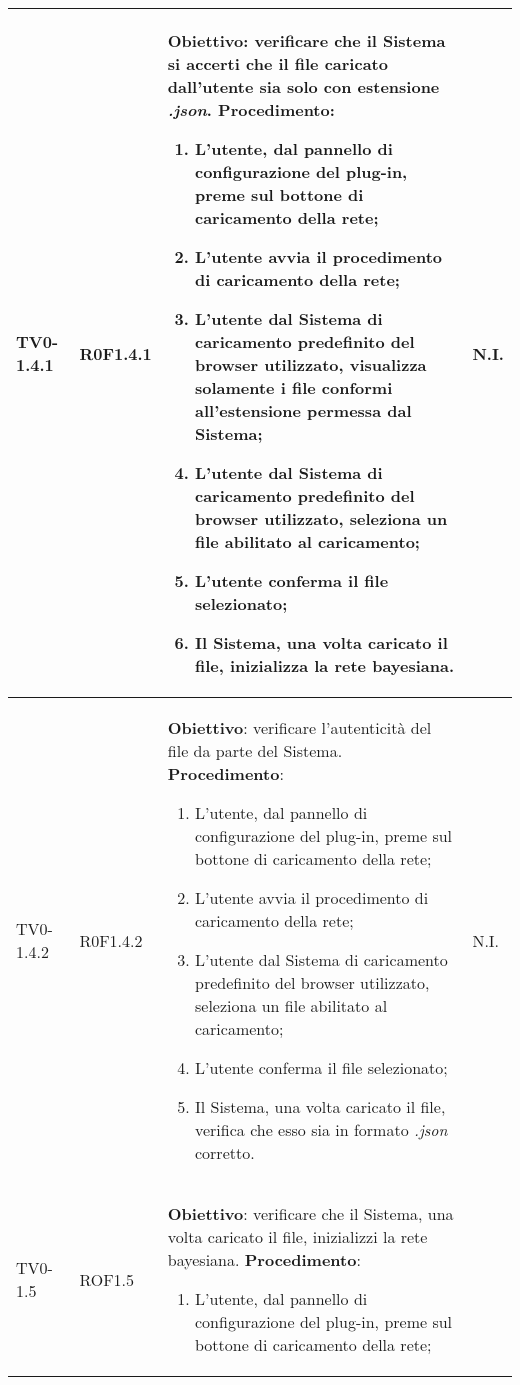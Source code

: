 \begin{longtable}{|C{.15\textwidth}|C{.13\textwidth}|m{.52\textwidth}|C{.08\textwidth}|}
 TV0-1.4.1 & R0F1.4.1 &
	\textbf{Obiettivo}: verificare che il Sistema si accerti che il file caricato dall'utente sia solo con estensione \textit{.json}. \newline
	\textbf{Procedimento}:
	\begin{enumerate}
		\item L'utente, dal pannello di configurazione del plug-in, preme sul bottone di caricamento della rete;
		\item L'utente avvia il procedimento di caricamento della rete;
		\item L'utente dal Sistema di caricamento predefinito del browser utilizzato, visualizza solamente i file conformi all'estensione permessa dal Sistema;
		\item L'utente dal Sistema di caricamento predefinito del browser utilizzato, seleziona un file abilitato al caricamento;
		\item L'utente conferma il file selezionato;
		\item Il Sistema, una volta caricato il file, inizializza la rete bayesiana.
	\end{enumerate}
	& N.I. \\
\hline
TV0-1.4.2 & R0F1.4.2 &
	\textbf{Obiettivo}: verificare l'autenticità del file da parte del Sistema. \newline
	\textbf{Procedimento}:
	\begin{enumerate}
		\item L'utente, dal pannello di configurazione del plug-in, preme sul bottone di caricamento della rete;
		\item L'utente avvia il procedimento di caricamento della rete;
		\item L'utente dal Sistema di caricamento predefinito del browser utilizzato, seleziona un file abilitato al caricamento;
		\item L'utente conferma il file selezionato;
		\item Il Sistema, una volta caricato il file, verifica che esso sia in formato \textit{.json} corretto.
	\end{enumerate}
	& N.I. \\
\hline
{} TV0-1.5 & ROF1.5 &
	\textbf{Obiettivo}: verificare che il Sistema, una volta caricato il file, inizializzi la rete bayesiana. \newline
	\textbf{Procedimento}:
	\begin{enumerate}
		\item L'utente, dal pannello di configurazione del plug-in, preme sul bottone di caricamento della rete;

\end{enumerate}
\end{longtable}
